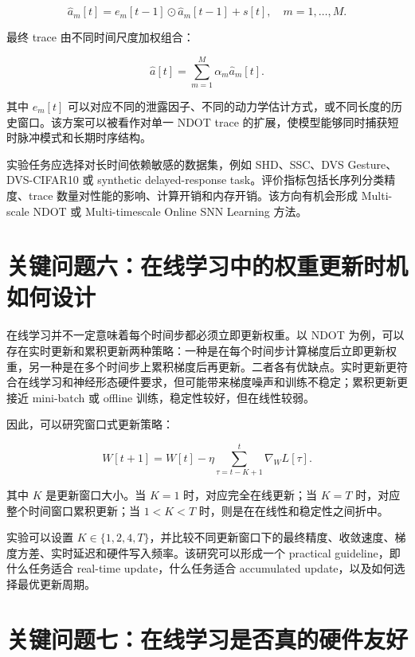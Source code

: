 \documentclass[11pt]{ctexart}
\begin{document}
\begin{equation}
\hat a_m[t]
=
e_m[t-1]\odot \hat a_m[t-1]+s[t],
\quad m=1,\dots,M.
\end{equation}

最终 trace 由不同时间尺度加权组合：

\begin{equation}
\hat a[t]
=
\sum_{m=1}^{M}\alpha_m\hat a_m[t].
\end{equation}

其中 $e_m[t]$ 可以对应不同的泄露因子、不同的动力学估计方式，或不同长度的历史窗口。该方案可以被看作对单一 NDOT trace 的扩展，使模型能够同时捕获短时脉冲模式和长期时序结构。

实验任务应选择对长时间依赖敏感的数据集，例如 SHD、SSC、DVS Gesture、DVS-CIFAR10 或 synthetic delayed-response task。评价指标包括长序列分类精度、trace 数量对性能的影响、计算开销和内存开销。该方向有机会形成 Multi-scale NDOT 或 Multi-timescale Online SNN Learning 方法。

\section{关键问题六：在线学习中的权重更新时机如何设计}

在线学习并不一定意味着每个时间步都必须立即更新权重。以 NDOT 为例，可以存在实时更新和累积更新两种策略：一种是在每个时间步计算梯度后立即更新权重，另一种是在多个时间步上累积梯度后再更新。二者各有优缺点。实时更新更符合在线学习和神经形态硬件要求，但可能带来梯度噪声和训练不稳定；累积更新更接近 mini-batch 或 offline 训练，稳定性较好，但在线性较弱。

因此，可以研究窗口式更新策略：

\begin{equation}
W[t+1]
=
W[t]
-
\eta
\sum_{\tau=t-K+1}^{t}
\nabla_W L[\tau].
\end{equation}

其中 $K$ 是更新窗口大小。当 $K=1$ 时，对应完全在线更新；当 $K=T$ 时，对应整个时间窗口累积更新；当 $1<K<T$ 时，则是在在线性和稳定性之间折中。

实验可以设置 $K\in\{1,2,4,T\}$，并比较不同更新窗口下的最终精度、收敛速度、梯度方差、实时延迟和硬件写入频率。该研究可以形成一个 practical guideline，即什么任务适合 real-time update，什么任务适合 accumulated update，以及如何选择最优更新周期。

\section{关键问题七：在线学习是否真的硬件友好}
\end{document}
